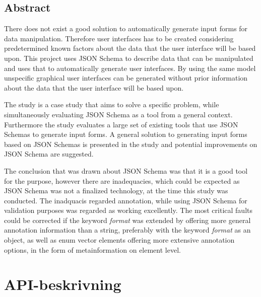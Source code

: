 \documentclass[10pt,a4paper,titlepage,twoside]{report}
\begin{document}
\clearpage

\section*{Abstract}
There does not exist a good solution to automatically generate input forms for data manipulation. Therefore user interfaces has to be created considering predetermined known factors about the data that the user interface will be based upon. This project uses JSON Schema to describe data that can be manipulated and uses that to automatically generate user interfaces. By using the same model unspecific graphical user interfaces can be generated without prior information about the data that the user interface will be based upon.

The study is a case study that aims to solve a specific problem, while simultaneously evaluating JSON Schema as a tool from a general context. Furthermore the study evaluates a large set of existing tools that use JSON Schemas to generate input forms. A general solution to generating input forms based on JSON Schemas is presented in the study and potential improvements on JSON Schema are suggested.

The conclusion that was drawn about JSON Schema was that it is a good tool for the purpose, however there are inadequacies, which could be expected as JSON Schema was not a finalized technology, at the time this study was conducted. The inadquacis regarded annotation, while using JSON Schema for validation purposes was regarded as working excellently. The most critical faults could be corrected if the keyword \textit{format} was extended by offering more general annotation information than a string, preferably with the keyword \textit{format} as an object, as well as enum vector elements offering more extensive annotation options, in the form of metainformation on element level.

\clearpage

\setlength{\parskip}{0pt}

\tableofcontents

\setlength{\parskip}{\baselineskip}


\mainmatter








\printbibliography[heading=bibintoc] %

\appendix

\chapter{API-beskrivning}
\label{appendix:api-beskrivning}
\end{document}
